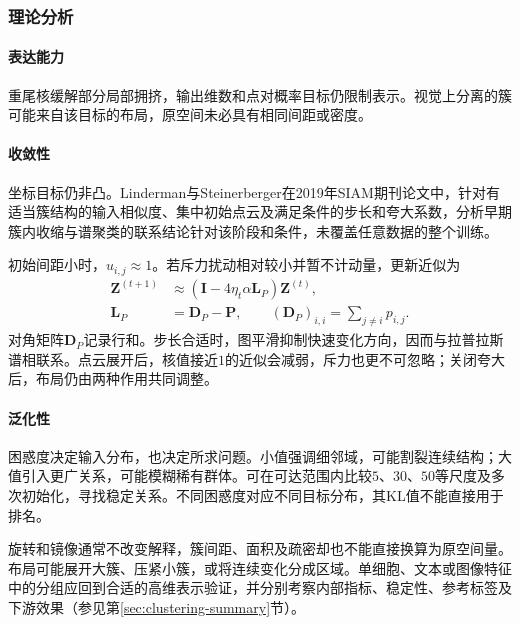 \subsubsection{理论分析}
\label{sec:dim-tsne-theory}

\paragraph{表达能力}
重尾核缓解部分局部拥挤，输出维数和点对概率目标仍限制表示。视觉上分离的簇可能来自该目标的布局，原空间未必具有相同间距或密度。

\paragraph{收敛性}

坐标目标仍非凸。Linderman与Steinerberger在2019年SIAM期刊论文中，针对有适当簇结构的输入相似度、集中初始点云及满足条件的步长和夸大系数，分析早期簇内收缩与谱聚类的联系结论针对该阶段和条件，未覆盖任意数据的整个训练。

初始间距小时，$u_{i,j}\approx1$。若斥力扰动相对较小并暂不计动量，更新近似为
\begin{equation}
  \label{eq:dim-tsne-spectral-approximation}
  \begin{aligned}
    \bm{Z}^{(t+1)}
      &\approx(\bm{I}-4\eta_t\alpha\bm{L}_{P})\bm{Z}^{(t)},\\
    \bm{L}_{P}&=\bm{D}_{P}-\bm{P},\qquad
    (\bm{D}_{P})_{i,i}=\sum_{j\ne i}p_{i,j}.
  \end{aligned}
\end{equation}
对角矩阵$\bm{D}_{P}$记录行和。步长合适时，图平滑抑制快速变化方向，因而与拉普拉斯谱相联系。点云展开后，核值接近$1$的近似会减弱，斥力也更不可忽略；关闭夸大后，布局仍由两种作用共同调整。

\paragraph{泛化性}

困惑度决定输入分布，也决定所求问题。小值强调细邻域，可能割裂连续结构；大值引入更广关系，可能模糊稀有群体。可在可达范围内比较$5$、$30$、$50$等尺度及多次初始化，寻找稳定关系。不同困惑度对应不同目标分布，其KL值不能直接用于排名。

旋转和镜像通常不改变解释，簇间距、面积及疏密却也不能直接换算为原空间量。布局可能展开大簇、压紧小簇，或将连续变化分成区域。单细胞、文本或图像特征中的分组应回到合适的高维表示验证，并分别考察内部指标、稳定性、参考标签及下游效果（参见第\ref{sec:clustering-summary}节）。

